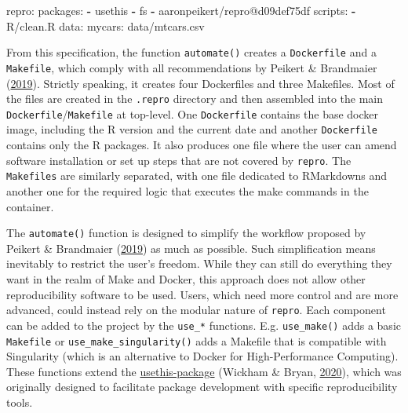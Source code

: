 \documentclass[12pt,a4paper,twoside]{article}
\newenvironment{Shaded}{\begin{snugshade}}{\end{snugshade}}
\newcommand{\AttributeTok}[1]{\textcolor[rgb]{0.77,0.63,0.00}{#1}}
\newcommand{\FunctionTok}[1]{\textcolor[rgb]{0.00,0.00,0.00}{#1}}
\newcommand{\KeywordTok}[1]{\textcolor[rgb]{0.13,0.29,0.53}{\textbf{#1}}}
\newcommand{\NormalTok}[1]{#1}
\begin{document}
\begin{Shaded}
\begin{Highlighting}[]
\FunctionTok{repro:}
  \FunctionTok{packages:}
    \KeywordTok{-}\NormalTok{ usethis}
    \KeywordTok{-}\NormalTok{ fs}
    \KeywordTok{-}\NormalTok{ aaronpeikert/repro@d09def75df}
  \FunctionTok{scripts:}
    \KeywordTok{-}\NormalTok{ R/clean.R}
  \FunctionTok{data:}
    \FunctionTok{mycars:}\AttributeTok{ data/mtcars.csv}
\end{Highlighting}
\end{Shaded}

From this specification, the function \texttt{automate()} creates a \texttt{Dockerfile} and a \texttt{Makefile}, which comply with all recommendations by Peikert \& Brandmaier (\protect\hyperlink{ref-peikertReproducibleDataAnalysis2019}{2019}).
Strictly speaking, it creates four Dockerfiles and three Makefiles.
Most of the files are created in the \texttt{.repro} directory and then assembled into the main \texttt{Dockerfile}/\texttt{Makefile} at top-level.
One \texttt{Dockerfile} contains the base docker image, including the R version and the current date and another \texttt{Dockerfile} contains only the R packages.
It also produces one file where the user can amend software installation or set up steps that are not covered by \texttt{repro}.
The \texttt{Makefiles} are similarly separated, with one file dedicated to RMarkdowns and another one for the required logic that executes the make commands in the container.

The \texttt{automate()} function is designed to simplify the workflow proposed by Peikert \& Brandmaier (\protect\hyperlink{ref-peikertReproducibleDataAnalysis2019}{2019}) as much as possible.
Such simplification means inevitably to restrict the user's freedom.
While they can still do everything they want in the realm of Make and Docker, this approach does not allow other reproducibility software to be used.
Users, which need more control and are more advanced, could instead rely on the modular nature of \texttt{repro}.
Each component can be added to the project by the \texttt{use\_*} functions.
E.g. \texttt{use\_make()} adds a basic \texttt{Makefile} or \texttt{use\_make\_singularity()} adds a Makefile that is compatible with Singularity (which is an alternative to Docker for High-Performance Computing).
These functions extend the \href{https://usethis.r-lib.org}{usethis-package} (Wickham \& Bryan, \protect\hyperlink{ref-R-usethis}{2020}), which was originally designed to facilitate package development with specific reproducibility tools.
\end{document}
